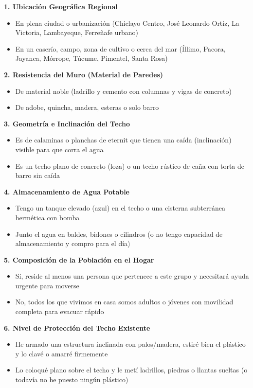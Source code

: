 \documentclass[12pt, letterpaper]{article}
\begin{document}
\textbf{1. Ubicación Geográfica Regional}
\begin{itemize}[label={}]
  \item [A] En plena ciudad o urbanización (Chiclayo Centro, José Leonardo Ortiz, La Victoria, Lambayeque, Ferreñafe urbano)
  \item [B] En un caserío, campo, zona de cultivo o cerca del mar (Íllimo, Pacora, Jayanca, Mórrope, Túcume, Pimentel, Santa Rosa)
\end{itemize}

\textbf{2. Resistencia del Muro (Material de Paredes)}
\begin{itemize}[label={}]
  \item [A] De material noble (ladrillo y cemento con columnas y vigas de concreto)
  \item [B] De adobe, quincha, madera, esteras o solo barro
\end{itemize}

\textbf{3. Geometría e Inclinación del Techo}
\begin{itemize}[label={}]
  \item [A] Es de calaminas o planchas de eternit que tienen una caída (inclinación) visible para que corra el agua
  \item [B] Es un techo plano de concreto (loza) o un techo rústico de caña con torta de barro sin caída
\end{itemize}

\textbf{4. Almacenamiento de Agua Potable}
\begin{itemize}[label={}]
  \item [A] Tengo un tanque elevado (azul) en el techo o una cisterna subterránea hermética con bomba
  \item [B] Junto el agua en baldes, bidones o cilindros (o no tengo capacidad de almacenamiento y compro para el día)
\end{itemize}

\textbf{5. Composición de la Población en el Hogar}
\begin{itemize}[label={}]
  \item [A] Sí, reside al menos una persona que pertenece a este grupo y necesitará ayuda urgente para moverse
  \item [B] No, todos los que vivimos en casa somos adultos o jóvenes con movilidad completa para evacuar rápido
\end{itemize}

\textbf{6. Nivel de Protección del Techo Existente}
\begin{itemize}[label={}]
  \item [A] He armado una estructura inclinada con palos/madera, estiré bien el plástico y lo clavé o amarré firmemente
  \item [B] Lo coloqué plano sobre el techo y le metí ladrillos, piedras o llantas sueltas (o todavía no he puesto ningún plástico)
\end{itemize}
\end{document}
